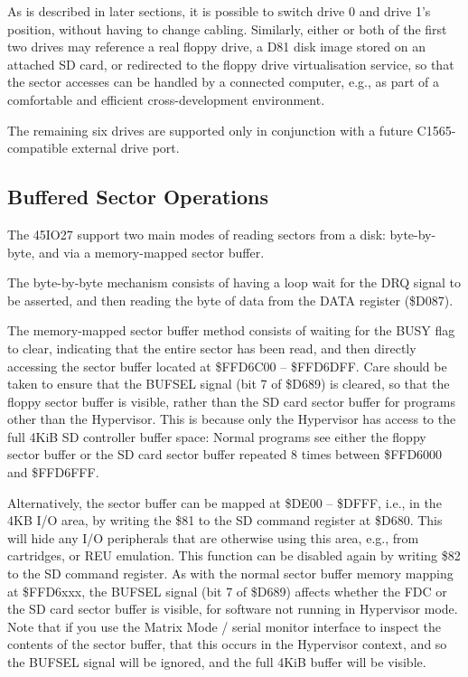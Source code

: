 As is described in later sections, it is possible to switch drive 0
and drive 1's position, without having to change cabling. Similarly,
either or both of the first two drives may reference a real floppy
drive, a D81 disk image stored on an attached SD card, or redirected
to the floppy drive virtualisation service, so that the sector
accesses can be handled by a connected computer, e.g., as part of a
comfortable and efficient cross-development environment.

The remaining six drives are supported only in conjunction with a
future C1565-compatible external drive port.

\subsection{Buffered Sector Operations}
\label{subsec:reading-from-disks-and-buffer-management}

The 45IO27 support two main modes of reading sectors from a
disk: byte-by-byte, and via a memory-mapped sector buffer.

The byte-by-byte mechanism consists of having a loop wait for the DRQ
signal to be asserted, and then reading the byte of data from the DATA
register (\$D087).

The memory-mapped sector buffer method consists of waiting for the
BUSY flag to clear, indicating that the entire sector has been read,
and then directly accessing the sector buffer located at \$FFD6C00 --
\$FFD6DFF. Care should be taken to ensure that the BUFSEL signal (bit 7 of \$D689) is
cleared, so that the floppy sector buffer is visible, rather than the
SD card sector buffer for programs other than the Hypervisor. This
is because only the Hypervisor has access to the full 4KiB SD
controller buffer space: Normal programs see either the floppy
sector buffer or the SD card sector buffer repeated 8 times between
\$FFD6000 and \$FFD6FFF.

Alternatively, the sector buffer can be mapped at \$DE00 -- \$DFFF,
i.e., in the 4KB I/O area, by writing the \$81 to the SD command
register at \$D680.  This will hide any I/O peripherals that are
otherwise using this area, e.g., from cartridges, or REU emulation.
This function can be disabled again by writing \$82 to the SD command
register. As with the normal sector buffer memory mapping at
\$FFD6xxx, the BUFSEL signal (bit 7 of \$D689) affects whether the FDC
or the SD card sector buffer is visible, for software not running in
Hypervisor mode.  Note that if you use the Matrix Mode / serial monitor
interface to inspect the contents of the sector buffer, that this occurs
in the Hypervisor context, and so the BUFSEL signal will be ignored,
and the full 4KiB buffer will be visible.

